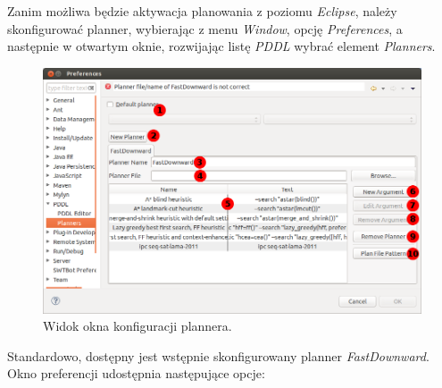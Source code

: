 Zanim możliwa będzie aktywacja planowania z poziomu \textit{Eclipse}, należy skonfigurować planner, wybierając z menu \textit{Window}, opcję \textit{Preferences}, a następnie w otwartym oknie, rozwijając listę \textit{PDDL} wybrać element \textit{Planners}.

\newpage
\begin{figure}[h!]
    \centering
    \includegraphics[width=\textwidth]{img/planner_preferences_window}
    \caption{Widok okna konfiguracji plannera.}
    \label{fig:preferences_window}
\end{figure}
Standardowo, dostępny jest wstępnie skonfigurowany planner \textit{FastDownward}. Okno preferencji udostępnia następujące opcje:
